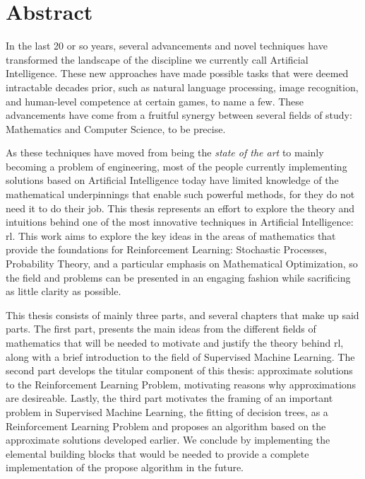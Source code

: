 \cleardoublepage

\chapter*{Abstract}

In the last 20 or so years, several advancements and novel
techniques have transformed the landscape of the discipline we currently call
Artificial Intelligence. These new approaches have made possible tasks that were
deemed intractable decades prior, such as natural language processing, image
recognition, and human-level competence at certain games, to name a few. These
advancements have come from a fruitful synergy between several fields of study:
Mathematics and Computer Science, to be precise.

As these techniques have moved from being the \textit{state of the art} to
mainly becoming a problem of engineering, most of the people currently
implementing solutions based on Artificial Intelligence today have limited
knowledge of the mathematical underpinnings that enable such powerful methods,
for they do not need it to do their job. This thesis represents an effort to
explore the theory and intuitions behind one of the most innovative techniques
in Artificial Intelligence: \acf{rl}. This work aims to explore the key ideas in
the areas of mathematics that provide the foundations for Reinforcement
Learning: Stochastic Processes, Probability Theory, and a particular emphasis on
Mathematical Optimization, so the field and problems can be presented in an
engaging fashion while sacrificing as little clarity as possible.

This thesis consists of mainly three parts, and several chapters that make up
said parts. The first part, presents the main ideas from the different fields of
mathematics that will be needed to motivate and justify the theory behind
\ac{rl}, along with a brief introduction to the field of Supervised Machine
Learning. The second part develops the titular component of this thesis:
approximate solutions to the Reinforcement Learning Problem, motivating reasons
why approximations are desireable. Lastly, the third part motivates the framing
of an important problem in Supervised Machine Learning, the fitting of decision
trees, as a Reinforcement Learning Problem and proposes an algorithm based on
the approximate solutions developed earlier. We conclude by implementing the
elemental building blocks that would be needed to provide a complete
implementation of the propose algorithm in the future.

\cleardoublepage